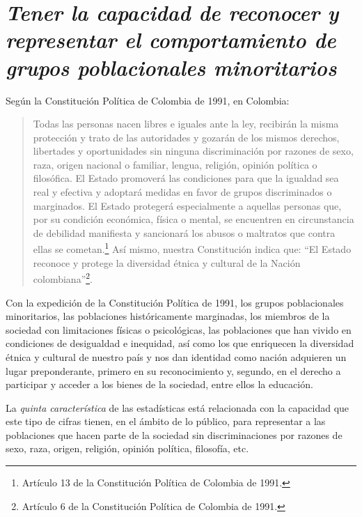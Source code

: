 \documentclass[
]{book}
\begin{document}
\hypertarget{tener-la-capacidad-de-reconocer-y-representar-el-comportamiento-de-grupos-poblacionales-minoritarios}{%
\chapter{\texorpdfstring{\textbf{\emph{Tener la capacidad de reconocer y representar el comportamiento de grupos poblacionales minoritarios}}}{Tener la capacidad de reconocer y representar el comportamiento de grupos poblacionales minoritarios}}\label{tener-la-capacidad-de-reconocer-y-representar-el-comportamiento-de-grupos-poblacionales-minoritarios}}

Según la Constitución Política de Colombia de 1991, en Colombia:

\begin{quote}
Todas las personas nacen libres e iguales ante la ley, recibirán la misma protección y trato de las autoridades y gozarán de los mismos derechos, libertades y oportunidades sin ninguna discriminación por razones de sexo, raza, origen nacional o familiar, lengua, religión, opinión política o filosófica. El Estado promoverá las condiciones para que la igualdad sea real y efectiva y adoptará medidas en favor de grupos discriminados o marginados. El Estado protegerá especialmente a aquellas personas que, por su condición económica, física o mental, se encuentren en circunstancia de debilidad manifiesta y sancionará los abusos o maltratos que contra ellas se cometan.\footnote{Artículo 13 de la Constitución Política de Colombia de 1991.}
Así mismo, nuestra Constitución indica que: ``El Estado reconoce y protege la diversidad étnica y cultural de la Nación colombiana''\footnote{Artículo 6 de la Constitución Política de Colombia de 1991.}.
\end{quote}

Con la expedición de la Constitución Política de 1991, los grupos poblacionales minoritarios, las poblaciones históricamente marginadas, los miembros de la sociedad con limitaciones físicas o psicológicas, las poblaciones que han vivido en condiciones de desigualdad e inequidad, así como los que enriquecen la diversidad étnica y cultural de nuestro país y nos dan identidad como nación adquieren un lugar preponderante, primero en su reconocimiento y, segundo, en el derecho a participar y acceder a los bienes de la sociedad, entre ellos la educación.

La \emph{quinta característica} de las estadísticas está relacionada con la capacidad que este tipo de cifras tienen, en el ámbito de lo público, para representar a las poblaciones que hacen parte de la sociedad sin discriminaciones por razones de sexo, raza, origen, religión, opinión política, filosofía, etc.
\end{document}
